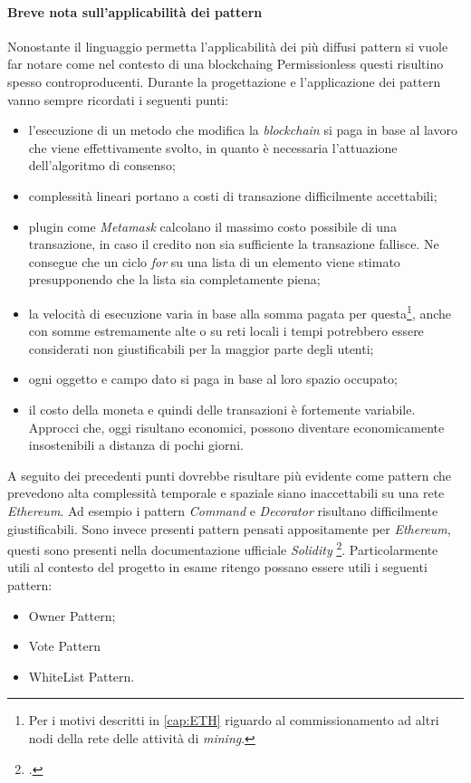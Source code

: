 \paragraph{Breve nota sull'applicabilità dei pattern}
Nonostante il linguaggio permetta l’applicabilità dei più diffusi pattern si vuole far notare come nel contesto di una \gls{blockchaing} Permissionless questi risultino spesso controproducenti. 
Durante la progettazione e l’applicazione dei pattern vanno sempre ricordati i seguenti punti:
\begin{itemize}
    \item l’esecuzione di un metodo che modifica la \emph{blockchain} si paga in base al lavoro che viene effettivamente svolto, in quanto è necessaria l'attuazione dell'algoritmo di consenso;
    \item complessità lineari portano a costi di transazione difficilmente accettabili;
    \item plugin come \emph{Metamask} calcolano il massimo costo possibile di una transazione, in caso il credito non sia sufficiente la transazione fallisce. Ne consegue che un ciclo \emph{for} su una lista di un elemento viene stimato presupponendo che la lista sia completamente piena;
    \item la velocità di esecuzione varia in base alla somma pagata per questa\footnote{Per i motivi descritti in \ref{cap:ETH} riguardo al commissionamento ad altri nodi della rete delle attività di \emph{mining}.}, anche con somme estremamente alte o su reti locali i tempi potrebbero essere considerati non giustificabili per la maggior parte degli utenti;
    \item ogni oggetto e campo dato si paga in base al loro spazio occupato;
    \item il costo della moneta e quindi delle transazioni è fortemente variabile. Approcci che, oggi risultano economici, possono diventare economicamente insostenibili a distanza di pochi giorni.
\end{itemize}
A seguito dei precedenti punti dovrebbe risultare più evidente come pattern che prevedono alta complessità temporale e spaziale siano inaccettabili su una rete \emph{Ethereum}. Ad esempio i pattern \emph{Command} e \emph{Decorator} risultano difficilmente giustificabili.
Sono invece presenti pattern pensati appositamente per \emph{Ethereum}, questi sono presenti nella documentazione ufficiale \emph{Solidity} \footcite{site:solidity-documentation}. Particolarmente utili al contesto del progetto in esame ritengo possano essere utili i seguenti pattern: 
\begin{itemize}
    \item Owner Pattern;
    \item Vote Pattern 
    \item WhiteList Pattern.
\end{itemize}

